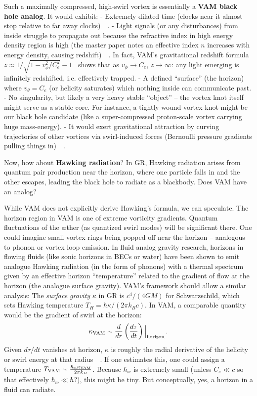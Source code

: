\documentclass[preprint]{revtex4-2}
\begin{document}
    Such a maximally compressed, high-swirl vortex is essentially a \textbf{VAM black hole analog}. It would exhibit:
    - Extremely dilated time (clocks near it almost stop relative to far away clocks)~\cite{reference_124}~\cite{reference_125}.
    - Light signals (or any disturbances) from inside struggle to propagate out because the refractive index in high energy density region is high (the master paper notes an effective index $n$ increases with energy density, causing redshift)~\cite{reference_126}~\cite{reference_127}. In fact, VAM’s gravitational redshift formula $z \approx 1/\sqrt{1 - v_\phi^2/C_e^2} - 1$~\cite{reference_128} shows that as $v_\phi \to C_e$, $z \to \infty$: any light emerging is infinitely redshifted, i.e. effectively trapped.
    - A defined “surface” (the horizon) where $v_\theta = C_e$ (or helicity saturates) which nothing inside can communicate past.
    - No singularity, but likely a very heavy stable “object” – the vortex knot itself might serve as a stable core. For instance, a tightly wound vortex knot might be our black hole candidate (like a super-compressed proton-scale vortex carrying huge mass-energy).
    - It would exert gravitational attraction by curving trajectories of other vortices via swirl-induced forces (Bernoulli pressure gradients pulling things in)~\cite{reference_129}~\cite{reference_130}.

    Now, how about \textbf{Hawking radiation}? In GR, Hawking radiation arises from quantum pair production near the horizon, where one particle falls in and the other escapes, leading the black hole to radiate as a blackbody. Does VAM have an analog?

    While VAM does not explicitly derive Hawking’s formula, we can speculate. The horizon region in VAM is one of extreme vorticity gradients. Quantum fluctuations of the æther (as quantized swirl modes) will be significant there. One could imagine small vortex rings being popped off near the horizon – analogous to phonon or vortex loop emission. In fluid analog gravity research, horizons in flowing fluids (like sonic horizons in BECs or water) have been shown to emit analogue Hawking radiation (in the form of phonons) with a thermal spectrum given by an effective horizon “temperature” related to the gradient of flow at the horizon (the analogue surface gravity). VAM’s framework should allow a similar analysis: The \emph{surface gravity} $\kappa$ in GR is $c^4/(4GM)$ for Schwarzschild, which sets Hawking temperature $T_H = \hbar \kappa/(2\pi k_B c)$. In VAM, a comparable quantity would be the gradient of swirl at the horizon:
    \[
        \kappa_{\rm VAM} \sim \frac{d}{dr}\left(\frac{d\tau}{dt}\right) \Big|_{\rm horizon}\,.
    \]
    Given $d\tau/dt$ vanishes at horizon, $\kappa$ is roughly the radial derivative of the helicity or swirl energy at that radius~\cite{reference_131}~\cite{reference_132}. If one estimates this, one could assign a temperature $T_{\rm VAM} \sim \frac{\hbar_{\text{\ae}} \kappa_{\rm VAM}}{2\pi k_B}$. Because $\hbar_{\text{\ae}}$ is extremely small (unless $C_e \ll c$ so that effectively $\hbar_{\text{\ae}} \ll \hbar$?), this might be tiny. But conceptually, yes, a horizon in a fluid can radiate.
\end{document}
